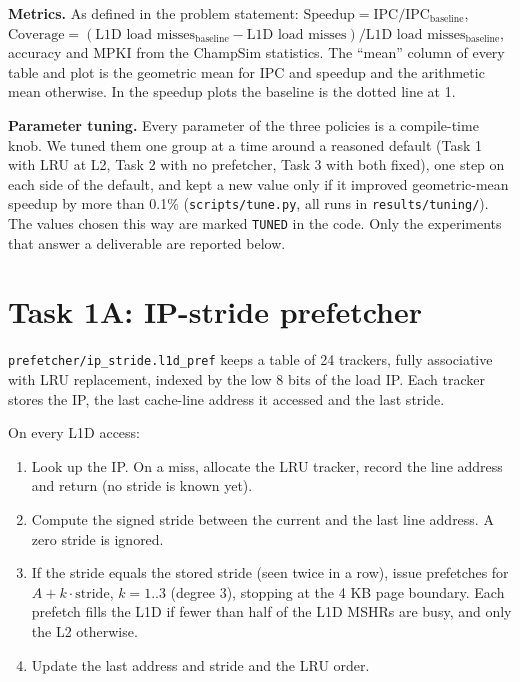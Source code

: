 \documentclass[12pt]{report}
\newcommand{\cfg}[1]{\texttt{#1}}
\begin{document}
\textbf{Metrics.} As defined in the problem statement:
$\text{Speedup} = \text{IPC}/\text{IPC}_{\text{baseline}}$,
$\text{Coverage} = (\text{L1D load misses}_{\text{baseline}} - \text{L1D load misses})/\text{L1D load misses}_{\text{baseline}}$,
accuracy and MPKI from the ChampSim statistics. The ``mean'' column of every
table and plot is the geometric mean for IPC and speedup and the arithmetic
mean otherwise. In the speedup plots the baseline is the dotted line at 1.

\textbf{Parameter tuning.} Every parameter of the three policies is a
compile-time knob. We tuned them one group at a time around a reasoned
default (Task 1 with LRU at L2, Task 2 with no prefetcher, Task 3 with both
fixed), one step on each side of the default, and kept a new value only if it
improved geometric-mean speedup by more than 0.1\%
(\cfg{scripts/tune.py}, all runs in \cfg{results/tuning/}). The values chosen
this way are marked \cfg{TUNED} in the code. Only the experiments that answer
a deliverable are reported below.

\chapter{Task 1A: IP-stride prefetcher}

\cfg{prefetcher/ip\_stride.l1d\_pref} keeps a table of 24 trackers, fully
associative with LRU replacement, indexed by the low 8 bits of the load IP.
Each tracker stores the IP, the last cache-line address it accessed and the
last stride.

On every L1D access:
\begin{enumerate}[nosep]
  \item Look up the IP. On a miss, allocate the LRU tracker, record the line
        address and return (no stride is known yet).
  \item Compute the signed stride between the current and the last line
        address. A zero stride is ignored.
  \item If the stride equals the stored stride (seen twice in a row), issue
        prefetches for $A + k\cdot\text{stride}$, $k=1..3$ (degree 3),
        stopping at the 4 KB page boundary. Each prefetch fills the L1D if
        fewer than half of the L1D MSHRs are busy, and only the L2 otherwise.
  \item Update the last address and stride and the LRU order.
\end{enumerate}
\end{document}
